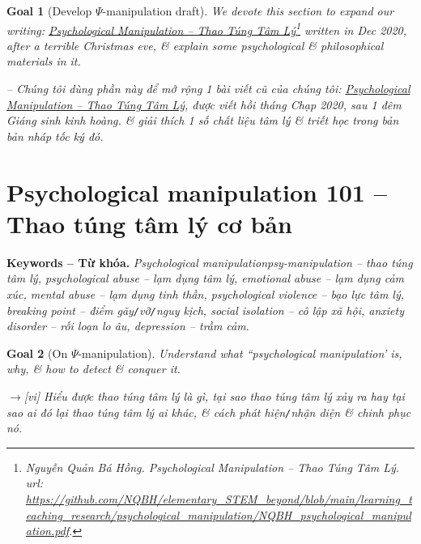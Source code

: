 \documentclass[12pt,oneside]{book}
\newtheorem{goal}{Goal}
\begin{document}
\begin{goal}[Develop $\Psi$-manipulation draft]
	We devote this section to expand our writing: \href{https://github.com/NQBH/elementary_STEM_beyond/blob/main/learning_teaching_research/psychological_manipulation/NQBH_psychological_manipulation.pdf}{Psychological Manipulation -- Thao Túng Tâm Lý}\footnote{{\sc Nguyễn Quản Bá Hồng}. {\it Psychological Manipulation -- Thao Túng Tâm Lý}.\\{\sc url}: \url{https://github.com/NQBH/elementary_STEM_beyond/blob/main/learning_teaching_research/psychological_manipulation/NQBH_psychological_manipulation.pdf}.} written in Dec 2020, after a terrible Christmas eve, \& explain some psychological \& philosophical materials in it.
	
	-- Chúng tôi dùng phần này để mở rộng 1 bài viết cũ của chúng tôi: \href{https://github.com/NQBH/elementary_STEM_beyond/blob/main/learning_teaching_research/psychological_manipulation/NQBH_psychological_manipulation.pdf}{Psychological Manipulation -- Thao Túng Tâm Lý}, được viết hồi tháng Chạp 2020, sau 1 đêm Giáng sinh kinh hoàng. \& giải thích 1 số chất liệu tâm lý \& triết học trong bản bản nháp tốc ký đó.
\end{goal}

\section{Psychological manipulation 101 -- Thao túng tâm lý cơ bản}
\label{sect: psychological manipulation}
{\bf Keywords -- Từ khóa.} {\it Psychological manipulation\Gls{psy-manipulation} -- thao túng tâm lý, psychological abuse -- lạm dụng tâm lý, emotional abuse -- lạm dụng cảm xúc, mental abuse -- lạm dụng tinh thần,  psychological violence -- bạo lực tâm lý, breaking point -- điểm gãy{\tt/}vỡ{\tt/}nguy kịch, social isolation -- cô lập xã hội, anxiety disorder -- rối loạn lo âu, depression -- trầm cảm}.

\begin{goal}[On $\Psi$-manipulation]
	Understand what ``psychological manipulation' is, why, \& how to detect \& conquer it.
	
	{\sf[en]$\to$[vi]} Hiểu được thao túng tâm lý là gì, tại sao thao túng tâm lý xảy ra hay tại sao ai đó lại thao túng tâm lý ai khác, \& cách phát hiện{\tt/}nhận diện \& chinh phục nó.
\end{goal}
\end{document}
